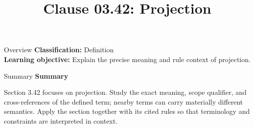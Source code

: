 \documentclass[10pt,letterpaper]{article}
\title{Clause 03.42: Projection}
\author{}
\date{}
\begin{document}
\maketitle
\begin{CornellOverviewBox}{Overview}
\textbf{Classification:} Definition\\[2pt]
\textbf{Learning objective:} Explain the precise meaning and rule context of projection.
\end{CornellOverviewBox}\begin{CornellSummaryBox}{Summary}
{\sffamily\bfseries\color{Accent} Summary}\par\vspace{3pt}Section 3.42 focuses on projection. Study the exact meaning, scope qualifier, and cross-references of the defined term; nearby terms can carry materially different semantics. Apply the section together with its cited rules so that terminology and constraints are interpreted in context.
\end{CornellSummaryBox}
\end{document}
